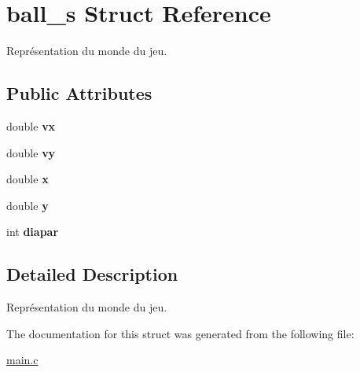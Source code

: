 \hypertarget{structball__s}{\section{ball\-\_\-s Struct Reference}
\label{structball__s}
}


Représentation du monde du jeu.  


\subsection*{Public Attributes}
\begin{DoxyCompactItemize}
\item 
\hypertarget{structball__s_a715881bcf5420f98dac1899b0c6af0b6}{double {\bfseries vx}}\label{structball__s_a715881bcf5420f98dac1899b0c6af0b6}

\item 
\hypertarget{structball__s_ae3430263557bdd1969ed50c6af37647a}{double {\bfseries vy}}\label{structball__s_ae3430263557bdd1969ed50c6af37647a}

\item 
\hypertarget{structball__s_a8d2342c7c3c48faadb16d9e1ae8d48ad}{double {\bfseries x}}\label{structball__s_a8d2342c7c3c48faadb16d9e1ae8d48ad}

\item 
\hypertarget{structball__s_ae2a3d07e84e190a1ce16abba2189ec67}{double {\bfseries y}}\label{structball__s_ae2a3d07e84e190a1ce16abba2189ec67}

\item 
\hypertarget{structball__s_a825961f17893f49a942a06b19c28b4a6}{int {\bfseries diapar}}\label{structball__s_a825961f17893f49a942a06b19c28b4a6}

\end{DoxyCompactItemize}


\subsection{Detailed Description}
Représentation du monde du jeu. 

The documentation for this struct was generated from the following file\-:\begin{DoxyCompactItemize}
\item 
\hyperlink{main_8c}{main.\-c}\end{DoxyCompactItemize}
